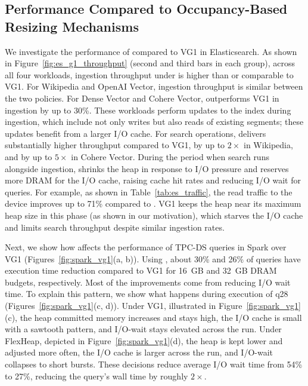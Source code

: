 \subsection{Performance Compared to Occupancy-Based Resizing Mechanisms}

We investigate the performance of \flexheapName{} compared to VG1 in Elasticsearch.
As shown in Figure~\ref{fig:es_g1_throughput} (second and third bars in each group), across all four workloads, ingestion throughput under \flexheapName{} is higher than or comparable to VG1.
For Wikipedia and OpenAI Vector, ingestion throughput is similar between the two policies.
For Dense Vector and Cohere Vector, \flexheapName{} outperforms VG1 in ingestion by up to 30\%.
These workloads perform updates to the index during ingestion, which include not only writes but also reads of existing segments; these updates benefit from a larger I/O cache.
For search operations, \flexheapName{} delivers substantially higher throughput compared to VG1, by up to $2\times$ in Wikipedia, and by up to $5\times$ in Cohere Vector.
During the period when search runs alongside ingestion, \flexheapName{} shrinks the heap in response to I/O pressure and reserves more DRAM for the I/O cache, raising cache hit rates and reducing I/O wait for queries.
For example, as shown in Table~\ref{tab:es_traffic}, the read traffic to the device improves up to 71\% compared to \flexheapName{}.
VG1 keeps the heap near its maximum heap size in this phase (as shown in our motivation), which starves the I/O cache and limits search throughput despite similar ingestion rates.

Next, we show how \flexheapName{} affects the performance of TPC-DS queries in Spark over VG1 (Figures~\ref{fig:spark_vg1}(a, b)).
Using \flexheapName{}, about 30\% and 26\% of queries have execution time reduction compared to VG1 for \SI{16}{GB} and \SI{32}{GB} DRAM budgets, respectively.
Most of the improvements come from reducing I/O wait time.
To explain this pattern, we show what happens during execution of q28 (Figures~\ref{fig:spark_vg1}(c, d)).
Under VG1, illustrated in Figure~\ref{fig:spark_vg1}(c), the heap committed memory increases and stays high, the I/O cache is small with a sawtooth pattern, and I/O-wait stays elevated across the run.
Under FlexHeap, depicted in Figure~\ref{fig:spark_vg1}(d), the heap is kept lower and adjusted more often, the I/O cache is larger across the run, and I/O-wait collapses to short bursts.
These decisions reduce average I/O wait time from 54\% to 27\%, reducing the query’s wall time by roughly $2\times$.

